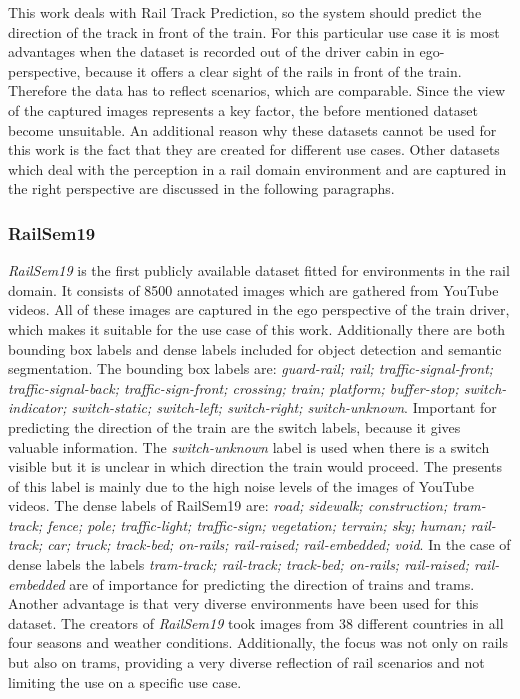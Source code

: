 This work deals with Rail Track Prediction, so the system should predict the direction of the track in front of the train. For this particular use case it is most advantages when the dataset is recorded out of the driver cabin in ego-perspective, because it offers a clear sight of the rails in front of the train. Therefore the data has to reflect scenarios, which are comparable. Since the view of the captured images represents a key factor, the before mentioned dataset become unsuitable. An additional reason why these datasets cannot be used for this work is the fact that they are created for different use cases.
Other datasets which deal with the perception in a rail domain environment and are captured in the right perspective are discussed in the following paragraphs.


\subsubsection{RailSem19}
\textit{RailSem19} \cite{railsem19dataset} is the first publicly available dataset fitted for environments in the rail domain. It consists of 8500 annotated images which are gathered from YouTube videos. All of these images are captured in the ego perspective of the train driver, which makes it suitable for the use case of this work. Additionally there are both bounding box labels and dense labels included for object detection and semantic segmentation. The bounding box labels are: \textit{guard-rail; rail; traffic-signal-front; traffic-signal-back; traffic-sign-front; crossing; train; platform; buffer-stop; switch-indicator; switch-static; switch-left; switch-right; switch-unknown}. Important for predicting the direction of the train are the switch labels, because  it gives valuable information. The \textit{switch-unknown} label is used when there is a switch visible but it is unclear in which direction the train would proceed. The presents of this label is mainly due to the high noise levels of the images of YouTube videos.
The dense labels of RailSem19 are: \textit{road; sidewalk; construction; tram-track; fence; pole; traffic-light; traffic-sign; vegetation; terrain; sky; human; rail-track; car; truck; track-bed; on-rails; rail-raised; rail-embedded; void}. In the case of dense labels the labels \textit{tram-track; rail-track; track-bed; on-rails; rail-raised; rail-embedded} are of importance for predicting the direction of trains and trams.
Another advantage is that very diverse environments have been used for this dataset. The creators of \textit{RailSem19} took images from 38 different countries in all four seasons and weather conditions. Additionally, the focus was not only on rails but also on trams, providing a very diverse reflection of rail scenarios and not limiting the use on a specific use case.

